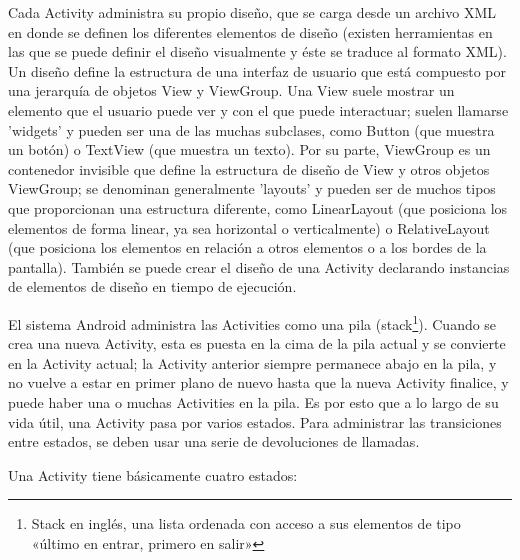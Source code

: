Cada Activity administra su propio diseño, que se carga desde un archivo XML en donde se definen los diferentes elementos de diseño (existen herramientas en las que se puede definir el diseño visualmente y éste se traduce al formato XML). Un diseño define la estructura de una interfaz de usuario que está compuesto por una jerarquía de objetos View y ViewGroup. Una View suele mostrar un elemento que el usuario puede ver y con el que puede interactuar; suelen llamarse 'widgets' y pueden ser una de las muchas subclases, como Button (que muestra un botón) o TextView (que muestra un texto). Por su parte, ViewGroup es un contenedor invisible que define la estructura de diseño de View y otros objetos ViewGroup; se denominan generalmente 'layouts'  y pueden ser de muchos tipos que proporcionan una estructura diferente, como LinearLayout (que posiciona los elementos de forma linear, ya sea horizontal o verticalmente) o RelativeLayout (que posiciona los elementos en relación a otros elementos o a los bordes de la pantalla).
También se puede crear el diseño de una Activity declarando instancias de elementos de diseño en tiempo de ejecución.

El sistema Android administra las Activities como una pila (stack\footnote{Stack en inglés, una lista ordenada con acceso a sus elementos de tipo «último en entrar, primero en salir»}). Cuando se crea una nueva Activity, esta es puesta en la cima de la pila actual y se convierte en la Activity actual; la Activity anterior siempre permanece abajo en la pila, y no vuelve a estar en primer plano de nuevo hasta que la nueva Activity finalice, y puede haber una o muchas Activities en la pila.
Es por esto que a lo largo de su vida útil, una Activity pasa por varios estados. Para administrar las transiciones entre estados, se deben usar una serie de devoluciones de llamadas.

Una Activity tiene básicamente cuatro estados:

